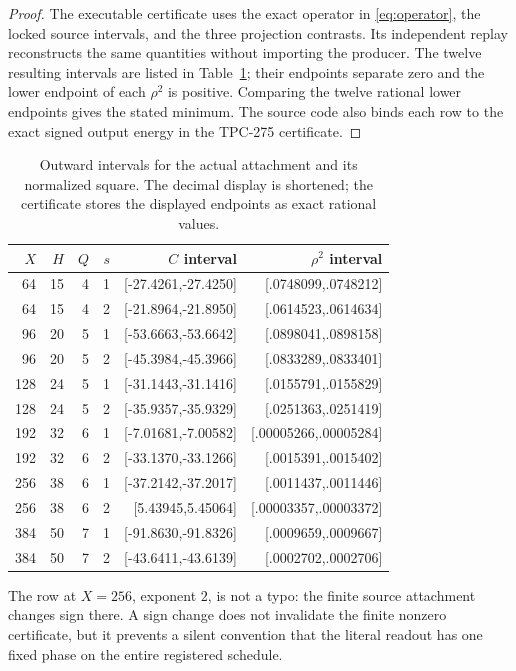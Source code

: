 \documentclass[11pt]{article}
\begin{document}
\begin{proof}
The executable certificate uses the exact operator in \eqref{eq:operator},
the locked source intervals, and the three projection contrasts.  Its
independent replay reconstructs the same quantities without importing the
producer.  The twelve resulting intervals are listed in Table~\ref{tab:rows};
their endpoints separate zero and the lower endpoint of each $\rho^2$ is
positive.  Comparing the twelve rational lower endpoints gives the stated
minimum.  The source code also binds each row to the exact signed output energy
in the TPC-275 certificate.
\end{proof}

\begin{table}[t]
\centering
\small
\caption{Outward intervals for the actual attachment and its normalized square.
The decimal display is shortened; the certificate stores the displayed
endpoints as exact rational values.}
\label{tab:rows}
\begin{tabular}{rrrrrr}
\toprule
$X$ & $H$ & $Q$ & $s$ & $C$ interval & $\rho^2$ interval\\
\midrule
64&15&4&1&[-27.4261,-27.4250]&[.0748099,.0748212]\\
64&15&4&2&[-21.8964,-21.8950]&[.0614523,.0614634]\\
96&20&5&1&[-53.6663,-53.6642]&[.0898041,.0898158]\\
96&20&5&2&[-45.3984,-45.3966]&[.0833289,.0833401]\\
128&24&5&1&[-31.1443,-31.1416]&[.0155791,.0155829]\\
128&24&5&2&[-35.9357,-35.9329]&[.0251363,.0251419]\\
192&32&6&1&[-7.01681,-7.00582]&[.00005266,.00005284]\\
192&32&6&2&[-33.1370,-33.1266]&[.0015391,.0015402]\\
256&38&6&1&[-37.2142,-37.2017]&[.0011437,.0011446]\\
256&38&6&2&[5.43945,5.45064]&[.00003357,.00003372]\\
384&50&7&1&[-91.8630,-91.8326]&[.0009659,.0009667]\\
384&50&7&2&[-43.6411,-43.6139]&[.0002702,.0002706]\\
\bottomrule
\end{tabular}
\end{table}

The row at $X=256$, exponent $2$, is not a typo: the finite source attachment
changes sign there.  A sign change does not invalidate the finite nonzero
certificate, but it prevents a silent convention that the literal readout has
one fixed phase on the entire registered schedule.
\end{document}
